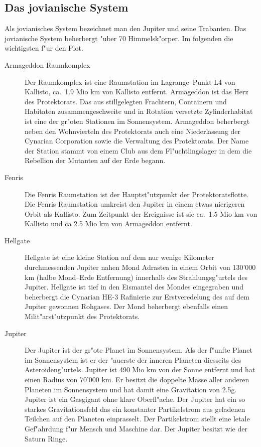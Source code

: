 \begin{appendices}
\section{Das jovianische System}

Als jovianisches System bezeichnet man den Jupiter und seine Trabanten. Das jovianische System beherbergt "uber 70  Himmelsk"orper. Im folgenden die wichtigsten f"ur den Plot.

\begin{description}
\item [Armageddon Raumkomplex] Der Raumkomplex ist eine Raumstation im Lagrange--Punkt L4 von Kallisto, ca.~1.9 Mio km         von Kallisto entfernt. Armageddon ist das Herz des Protektorats. Das aus stillgelegten Frachtern, Containern und
      Habitaten zusammengeschwei\3te und in Rotation versetzte Zylinderhabitat ist eine der gr"o\3ten Stationen im Sonnensystem. Armageddon beherbergt neben den Wohnvierteln des Protektorats auch eine Niederlassung der Cynarian Corporation sowie die Verwaltung des Protektorats. Der Name der Station stammt von einem Club aus dem Fl"uchtlingslager in dem die Rebellion der Mutanten auf der Erde begann.
\item [Fenris] Die Fenris Raumstation ist der Hauptst"utzpunkt der Protektoratsflotte. Die Fenris Raumstation umkreist
      den Jupiter in einem etwas nierigeren Orbit als Kallisto. Zum Zeitpunkt der Ereignisse ist sie ca.~1.5 Mio km von Kallisto und ca 2.5 Mio km von Armageddon entfernt.
\item [Hellgate] Hellgate ist eine kleine Station auf dem nur wenige Kilometer durchmessenden Jupiter nahen Mond
      Adrastea in einem Orbit von 130'000 km (halbe Mond--Erde Entfernung) innerhalb des Strahlungsg"urtels des Jupiter. Hellgate ist tief in den Eismantel des Mondes eingegraben und beherbergt die Cynarian HE-3 Rafinierie zur Erstveredelung des auf dem Jupiter gewonnen Rohgases. Der Mond beherbergt ebenfalls einen Milit"arst"utzpunkt des Protektorats.
\item [Jupiter] Der Jupiter ist der gr"o\3te Planet im Sonnensystem. Als der f"unfte Planet im Sonnensystem ist er der
      "au\3erste der inneren Planeten diesseits des Asteroideng"urtels. Jupiter ist 490 Mio km von der Sonne entfernt und hat einen Radius von 70'000 km. Er besitzt die doppelte Masse aller anderen Planeten im Sonnensystem und hat damit eine Gravitation von 2.5g. Jupiter ist ein Gasgigant ohne klare Oberfl"ache. Der Jupiter hat ein so starkes Gravitationsfeld das ein konstanter Partikelstrom aus geladenen Teilchen auf den Planeten einprasselt. Der Partikelstrom stellt eine letale Gef"ahrdung f"ur Mensch und Maschine dar. Der Jupiter besitzt wie der Saturn Ringe.

\end{description}
\end{appendices}
